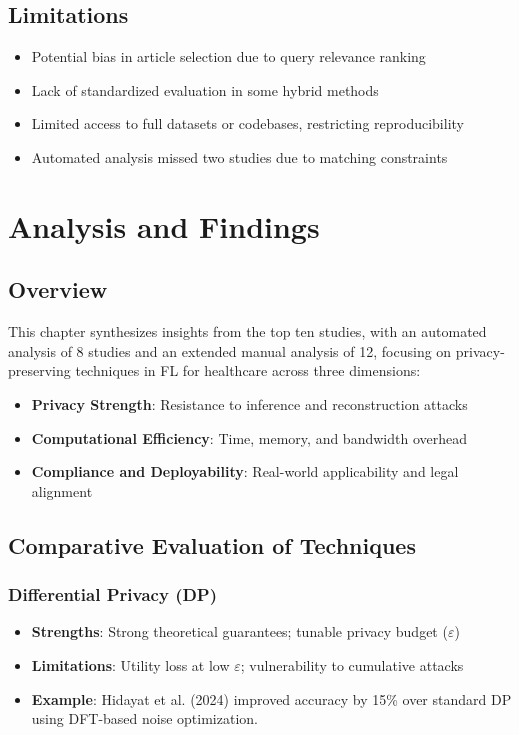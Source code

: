 \documentclass[12pt]{report}
\begin{document}
\section{Limitations}
\begin{itemize}
    \item Potential bias in article selection due to query relevance ranking
    \item Lack of standardized evaluation in some hybrid methods
    \item Limited access to full datasets or codebases, restricting reproducibility
    \item Automated analysis missed two studies due to matching constraints
\end{itemize}

\chapter{Analysis and Findings}

\section{Overview}
This chapter synthesizes insights from the top ten studies, with an automated analysis of 8 studies and an extended manual analysis of 12, focusing on privacy-preserving techniques in FL for healthcare across three dimensions:
\begin{itemize}
    \item \textbf{Privacy Strength}: Resistance to inference and reconstruction attacks
    \item \textbf{Computational Efficiency}: Time, memory, and bandwidth overhead
    \item \textbf{Compliance and Deployability}: Real-world applicability and legal alignment
\end{itemize}

\section{Comparative Evaluation of Techniques}

\subsection{Differential Privacy (DP)}
\begin{itemize}
    \item \textbf{Strengths}: Strong theoretical guarantees; tunable privacy budget ($\varepsilon$)
    \item \textbf{Limitations}: Utility loss at low $\varepsilon$; vulnerability to cumulative attacks
    \item \textbf{Example}: Hidayat et al. (2024) improved accuracy by 15\% over standard DP using DFT-based noise optimization.
\end{itemize}
\end{document}
